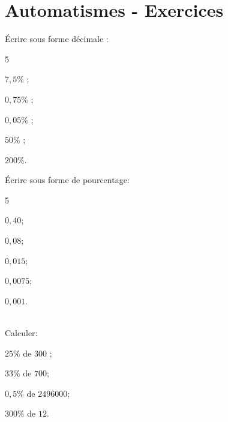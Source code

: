 \documentclass[a4paper,10pt]{book}        %
\begin{document}
\vspace{-0.6 cm}
\chapter{Automatismes - Exercices}
\thispagestyle{fancy}

\vspace{-0.8 cm}
\begin{minipage}[c]{0.60\linewidth}
\begin{enumMet}
	\item Écrire sous forme décimale :
	\begin{enumMet}
		\begin{multicols}{5}
			\item $7,5 \%$ ;
		\item $0,75\%$ ;
		\item $0,05\%$ ;
		\item $50\%$ ;
		\item $200\%$.
		\end{multicols}
	\end{enumMet}
	\item Écrire sous forme de pourcentage:
	\begin{enumMet}
		\begin{multicols}{5}
			\item $0,40$;
		\item $0,08$;
		\item $0,015$;
		\item $0,0075$;
		\item $0,001$.
		\end{multicols}
	\end{enumMet}
\end{enumMet}
	
\end{minipage} \hfill
\begin{minipage}[c]{0.38\linewidth}
	\\
	Calculer:
		\begin{enumMet}
			\item $25 \%$ de $300$ ;
			\item $33 \%$ de $700$;
			\item $0,5 \%$ de $2 496 000$;
			\item $300 \%$ de $12$.
		\end{enumMet}
\end{minipage}
\end{document}
